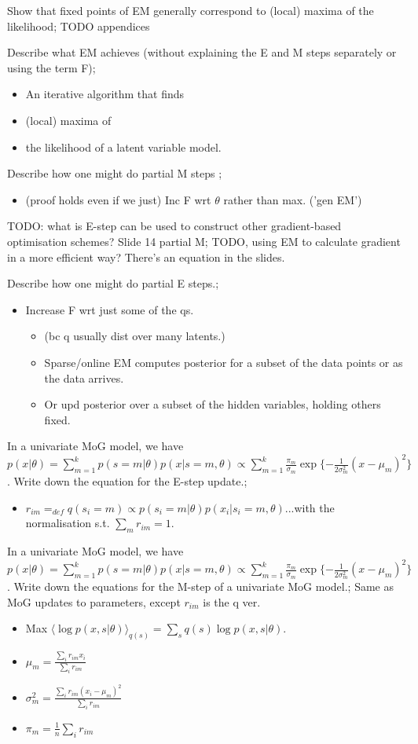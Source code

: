 \documentclass{article}
\begin{document}
Show that fixed points of EM generally correspond to (local) maxima of the likelihood; TODO appendices

Describe what EM achieves (without explaining the E and M steps separately or using the term F); \begin{itemize} \item An iterative algorithm that finds \item (local) maxima of \item the likelihood of a latent variable model.  \end{itemize}

Describe how one might do partial M steps ;\begin{itemize} \item (proof holds even if we just) Inc F wrt $\theta$ rather than max. ('gen EM') \end{itemize}

TODO: what is E-step can be used to construct other gradient-based optimisation schemes? Slide 14 partial M; TODO, using EM to calculate gradient in a more efficient way? There's an equation in the slides.

Describe how one might do partial E steps.; \begin{itemize} \item Increase F wrt just some of the qs. \begin{itemize} \item (bc q usually dist over many latents.) \item Sparse/online EM computes posterior for a subset of the data points or as the data arrives.  \item Or upd posterior over a subset of the hidden variables, holding others fixed.  \end{itemize} \end{itemize}
  
In a univariate MoG model, we have $p(x|\theta)=\sum_{m=1}^k p(s=m|\theta)p(x|s=m, \theta)\propto \sum^k_{m=1}\frac{\pi_m}{\sigma_m}\exp\{-\frac{1}{2\sigma^2_m}(x-\mu_m)^2\}$. Write down the equation for the E-step update.; \begin{itemize} \item $r_{im}=_{def}q(s_i=m)\propto p(s_i=m|\theta)p(x_i|s_i=m,\theta)$...with the normalisation s.t. $\sum_mr_{im}=1$.  \end{itemize}

In a univariate MoG model, we have $p(x|\theta)=\sum_{m=1}^k p(s=m|\theta)p(x|s=m, \theta)\propto \sum^k_{m=1}\frac{\pi_m}{\sigma_m}\exp\{-\frac{1}{2\sigma^2_m}(x-\mu_m)^2\}$. Write down the equations for the M-step of a univariate MoG model.; Same as MoG updates to parameters, except $r_{im}$ is the q ver. \begin{itemize} \item Max $\langle \log p(x,s|\theta) \rangle_{q(s)} = \sum_s q(s)\log p(x,s|\theta)$.  \item $\mu_m = \frac{\sum_i r_{im}x_i}{\sum_i r_{im}}$ \item $\sigma^2_m = \frac{\sum_i r_{im}(x_i-\mu_m)^2}{\sum_ir_{im}}$ \item $\pi_m = \frac{1}{n}\sum_ir_{im}$ \end{itemize}
\end{document}
